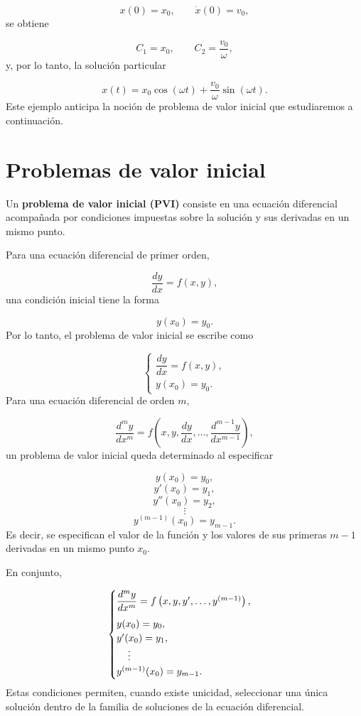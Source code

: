 \documentclass[12pt,a4paper]{article}
\begin{document}
	\[
	x(0)=x_0,
	\qquad
	\dot{x}(0)=v_0,
	\]
	se obtiene
	
	\[
	C_1=x_0,
	\qquad
	C_2=\frac{v_0}{\omega},
	\]
	y, por lo tanto, la solución particular
	
	\[
	x(t)=x_0\cos(\omega t)+\frac{v_0}{\omega}\sin(\omega t).
	\]
	Este ejemplo anticipa la noción de problema de valor inicial que estudiaremos a continuación.
	
	\clearpage
	\section{Problemas de valor inicial}
	
	Un \textbf{problema de valor inicial (PVI)} consiste en una ecuación diferencial acompañada por condiciones impuestas sobre la solución y sus derivadas en un mismo punto.
	
	Para una ecuación diferencial de primer orden,
	
	\[
	\frac{dy}{dx}
	=
	f(x,y),
	\]
	una condición inicial tiene la forma
	
	\[
	y(x_0)=y_0.
	\]
	Por lo tanto, el problema de valor inicial se escribe como
	
	\[
	\begin{cases}
		\dfrac{dy}{dx}=f(x,y),\\[0.3cm]
		y(x_0)=y_0.
	\end{cases}
	\]
	Para una ecuación diferencial de orden \(m\),
	
	\[
	\frac{d^m y}{dx^m}
	=
	f\left(
	x,
	y,
	\frac{dy}{dx},
	\dots,
	\frac{d^{m-1}y}{dx^{m-1}}
	\right),
	\]
	un problema de valor inicial queda determinado al especificar
	
	\[
	y(x_0)=y_0,
	\]
	\[
	y'(x_0)=y_1,
	\]
	\[
	y''(x_0)=y_2,
	\]
	\[
	\vdots
	\]
	\[
	y^{(m-1)}(x_0)=y_{m-1}.
	\]
	Es decir, se especifican el valor de la función y los valores de sus primeras \(m-1\) derivadas en un mismo punto \(x_0\).
	
	En conjunto,
	
	\[
	\begin{cases}
		\dfrac{d^m y}{dx^m}
		=
		f\left(
		x,
		y,
		y',
		\dots,
		y^{(m-1)}
		\right),\\[0.3cm]
		y(x_0)=y_0,\\
		y'(x_0)=y_1,\\
		\hspace{0.4cm}\vdots\\
		y^{(m-1)}(x_0)=y_{m-1}.
	\end{cases}
	\]
	Estas condiciones permiten, cuando existe unicidad, seleccionar una única solución dentro de la familia de soluciones de la ecuación diferencial.
	
\end{document}
